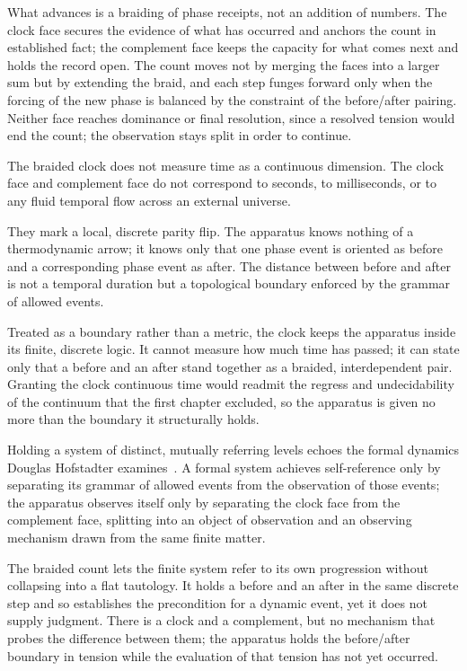 What advances is a braiding of phase receipts, not an addition of numbers. The clock face secures the evidence of what has occurred and anchors the count in established fact; the complement face keeps the capacity for what comes next and holds the record open. The count moves not by merging the faces into a larger sum but by extending the braid, and each step funges forward only when the forcing of the new phase is balanced by the constraint of the before/after pairing. Neither face reaches dominance or final resolution, since a resolved tension would end the count; the observation stays split in order to continue.

The braided clock does not measure time as a continuous dimension. The clock face and complement face do not correspond to seconds, to milliseconds, or to any fluid temporal flow across an external universe. 

They mark a local, discrete parity flip. The apparatus knows nothing of a thermodynamic arrow; it knows only that one phase event is oriented as before and a corresponding phase event as after. The distance between before and after is not a temporal duration but a topological boundary enforced by the grammar of allowed events. 

Treated as a boundary rather than a metric, the clock keeps the apparatus inside its finite, discrete logic. It cannot measure how much time has passed; it can state only that a before and an after stand together as a braided, interdependent pair. Granting the clock continuous time would readmit the regress and undecidability of the continuum that the first chapter excluded, so the apparatus is given no more than the boundary it structurally holds.

Holding a system of distinct, mutually referring levels echoes the formal dynamics Douglas Hofstadter examines~\cite{hofstadter1979}. A formal system achieves self-reference only by separating its grammar of allowed events from the observation of those events; the apparatus observes itself only by separating the clock face from the complement face, splitting into an object of observation and an observing mechanism drawn from the same finite matter.

The braided count lets the finite system refer to its own progression without collapsing into a flat tautology. It holds a before and an after in the same discrete step and so establishes the precondition for a dynamic event, yet it does not supply judgment. There is a clock and a complement, but no mechanism that probes the difference between them; the apparatus holds the before/after boundary in tension while the evaluation of that tension has not yet occurred.

